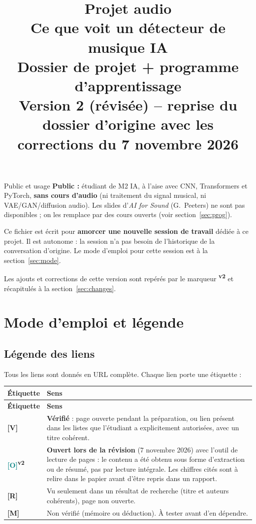 \documentclass[11pt,a4paper]{article}
\title{\textbf{Projet audio\\[2pt] \og{}Ce que voit un détecteur de musique IA\fg{}}\\[6pt]
  \large Dossier de projet + programme d'apprentissage\\[2pt]
  \normalsize Version 2 (révisée) -- reprise du dossier d'origine avec les corrections du 7 novembre 2026}
\author{}
\date{}
\newcommand{\vtwo}{\textsuperscript{\textcolor{orange!80!black}{\textbf{v2}}}}
\newcommand{\lV}{\textbf{\textcolor{green!45!black}{[V]}}}
\newcommand{\lO}{\textbf{\textcolor{teal}{[O]}}}
\newcommand{\lR}{\textbf{\textcolor{orange!80!black}{[R]}}}
\newcommand{\lM}{\textbf{\textcolor{red!70!black}{[M]}}}
\begin{document}
\maketitle
\thispagestyle{fancy}

\begin{info}{Public et usage}
\textbf{Public :} étudiant de M2 IA, à l'aise avec CNN, Transformers et PyTorch, \textbf{sans cours d'audio} (ni traitement du signal musical, ni VAE/GAN/diffusion audio). Les slides d'\emph{AI for Sound} (G.~Peeters) ne sont pas disponibles ; on les remplace par des cours ouverts (voir section~\ref{sec:prog}).

Ce fichier est écrit pour \textbf{amorcer une nouvelle session de travail} dédiée à ce projet. Il est autonome : la session n'a pas besoin de l'historique de la conversation d'origine. Le mode d'emploi pour cette session est à la section~\ref{sec:mode}.

Les ajouts et corrections de cette version sont repérés par le marqueur \vtwo{} et récapitulés à la section~\ref{sec:changes}.
\end{info}

\tableofcontents
\clearpage
\setcounter{section}{-1}
\section{Mode d'emploi et légende}\label{sec:s0}

\subsection{Légende des liens}
Tous les liens sont donnés en URL complète. Chaque lien porte une étiquette :

{\small
\begin{longtable}{L{1.3cm}L{14.2cm}}
\toprule
\textbf{Étiquette} & \textbf{Sens}\\
\midrule
\endfirsthead
\toprule
\textbf{Étiquette} & \textbf{Sens}\\
\midrule
\endhead
\bottomrule
\endfoot
\lV & \textbf{Vérifié} : page ouverte pendant la préparation, ou lien présent dans les listes que l'étudiant a explicitement autorisées, avec un titre cohérent.\\
\lO\vtwo & \textbf{Ouvert lors de la révision} (7 novembre 2026) avec l'outil de lecture de pages : le contenu a été obtenu sous forme d'extraction ou de résumé, pas par lecture intégrale. Les chiffres cités sont à relire dans le papier avant d'être repris dans un rapport.\\
\lR & Vu seulement dans un résultat de recherche (titre et auteurs cohérents), page non ouverte.\\
\lM & Non vérifié (mémoire ou déduction). À tester avant d'en dépendre.\\
\end{longtable}}
\end{document}
